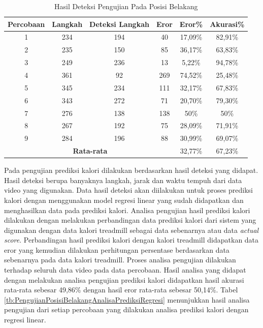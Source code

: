 \begin{longtable}{|c|c|c|c|c|c|}
  \caption{Hasil Deteksi Pengujian Pada Posisi Belakang}
  \label{tb:PengujianPosisiBelakangAnalisaDeteksi}                                   \\
  \hline
  \rowcolor[HTML]{C0C0C0}
  \textbf{Percobaan} & \textbf{Langkah} & \textbf{Deteksi Langkah} & \textbf{Eror} & \textbf{Eror\%} & \textbf{Akurasi\%} \\
  \hline
  1   & 234   & 194  & 40   & 17,09\%    & 82,91\%   \\
  \hline
  2   & 235   & 150  & 85   & 36,17\%    & 63,83\%   \\
  \hline
  3   & 249   & 236  & 13   & 5,22\%     & 94,78\%   \\
  \hline
  4   & 361   & 92   & 269  & 74,52\%    & 25,48\%   \\
  \hline
  5   & 345   & 234  & 111  & 32,17\%    & 67,83\%   \\
  \hline
  6   & 343   & 272  & 71   & 20,70\%    & 79,30\%   \\
  \hline
  7   & 276   & 138  & 138  & 50\%       & 50\%   \\
  \hline
  8   & 267   & 192  & 75   & 28,09\%    & 71,91\%   \\
  \hline
  9   & 284   & 196  & 88   & 30,99\%    & 69,07\%   \\
  \hline

  \multicolumn{4}{|c|}{\textbf{Rata-rata}} & 32,77\% & 67,23\% \\
  \hline
\end{longtable}

Pada pengujian prediksi kalori dilakukan berdasarkan hasil deteksi yang didapat. Hasil deteksi berupa banyaknya langkah, jarak dan waktu tempuh dari data video yang digunakan. Data hasil deteksi akan diilakukan untuk proses prediksi kalori dengan menggunakan model regresi linear yang sudah didapatkan dan menghasilkan data pada prediksi kalori. Analisa pengujian hasil prediksi kalori dilakukan dengan melakukan perbandingan data prediksi kalori dari sistem yang digunakan dengan data kalori treadmill sebagai data sebenarnya atau data \emph{actual score}. Perbandingan hasil prediksi kalori dengan kalori treadmill didapatkan data eror yang kemudian dilakukan perhitungan persentase berdasarkan data sebenarnya pada data kalori treadmill. Proses analisa pengujian dilakukan terhadap seluruh data video pada data percobaan. Hasil analisa yang didapat dengan melakukan analisa pengujian prediksi kalori didapatkan hasil akurasi rata-rata sebesar 49,86\% dengan hasil eror rata-rata sebesar 50,14\%. Tabel \ref{tb:PengujianPosisiBelakangAnalisaPrediksiRegresi} menunjukkan hasil analisa pengujian dari setiap percobaan yang dilakukan analisa prediksi kalori dengan regresi linear.

